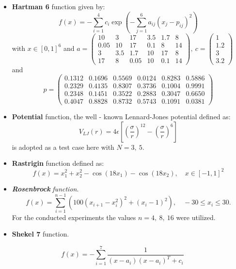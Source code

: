 \documentclass[journal,article,submit,pdftex,moreauthors]{Definitions/mdpi}
\begin{document}
\begin{itemize}
\item \textbf{Hartman 6} function given by:
\[
f(x)=-\sum_{i=1}^{4}c_{i}\exp\left(-\sum_{j=1}^{6}a_{ij}\left(x_{j}-p_{ij}\right)^{2}\right)
\]
with $x\in[0,1]^{6}$ and $a=\left(\begin{array}{cccccc}
10 & 3 & 17 & 3.5 & 1.7 & 8\\
0.05 & 10 & 17 & 0.1 & 8 & 14\\
3 & 3.5 & 1.7 & 10 & 17 & 8\\
17 & 8 & 0.05 & 10 & 0.1 & 14
\end{array}\right),\ c=\left(\begin{array}{c}
1\\
1.2\\
3\\
3.2
\end{array}\right)$ and
\[
p=\left(\begin{array}{cccccc}
0.1312 & 0.1696 & 0.5569 & 0.0124 & 0.8283 & 0.5886\\
0.2329 & 0.4135 & 0.8307 & 0.3736 & 0.1004 & 0.9991\\
0.2348 & 0.1451 & 0.3522 & 0.2883 & 0.3047 & 0.6650\\
0.4047 & 0.8828 & 0.8732 & 0.5743 & 0.1091 & 0.0381
\end{array}\right)
\]
\item \textbf{Potential} function, the well - known 
Lennard-Jones potential\cite{Jones} defined as:
\begin{equation}
V_{LJ}(r)=4\epsilon\left[\left(\frac{\sigma}{r}\right)^{12}-\left(\frac{\sigma}{r}\right)^{6}\right]\label{eq:potential}
\end{equation} 
is adopted as a test case here with $N=3,\ 5$.
\item \textbf{Rastrigin} function defined as:
\[
f(x)=x_{1}^{2}+x_{2}^{2}-\cos(18x_{1})-\cos(18x_{2}),\quad x\in[-1,1]^{2}
\]
\item \textbf{\emph{Rosenbrock}}\emph{ function}.\\
\[
f(x)=\sum_{i=1}^{n-1}\left(100\left(x_{i+1}-x_{i}^{2}\right)^{2}+\left(x_{i}-1\right)^{2}\right),\quad-30\le x_{i}\le30.
\]
For the conducted experiments the values  $n=4,\ 8,\ 16$ were utilized.
\item \textbf{Shekel 7} function.
\end{itemize}
\[
f(x)=-\sum_{i=1}^{7}\frac{1}{(x-a_{i})(x-a_{i})^{T}+c_{i}}
\]
\end{document}
